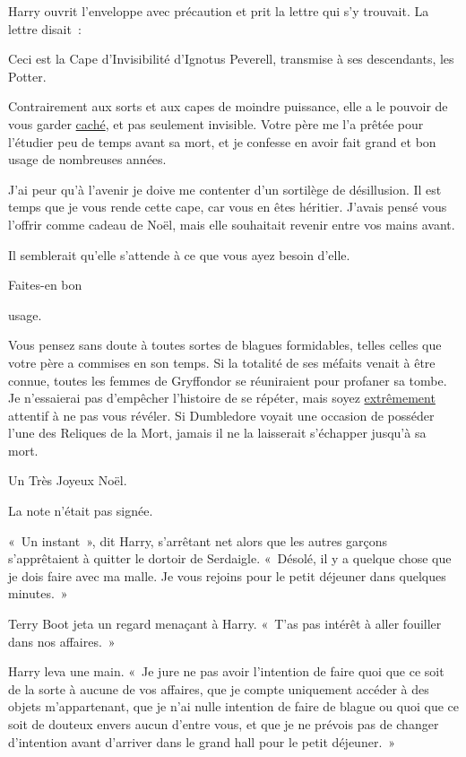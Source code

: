 Harry ouvrit l'enveloppe avec précaution et prit la lettre qui s'y trouvait.
La lettre disait~:
\begin{writtenNote}
Ceci est la Cape d'Invisibilité d'Ignotus Peverell, transmise à ses descendants, les Potter.
\strut Contrairement aux sorts et aux capes de moindre puissance, elle a le pouvoir de vous garder \underline{caché}, et pas seulement invisible.
Votre père me l'a prêtée pour l'étudier peu de temps avant sa mort, et je confesse en avoir fait grand et bon usage de nombreuses années.

J'ai peur qu'à l'avenir je doive me contenter d'un sortilège de désillusion.
Il est temps que je vous rende cette cape, car vous en êtes héritier.
J'avais pensé vous l'offrir comme cadeau de Noël, mais elle souhaitait revenir entre vos mains avant. \strut 
Il semblerait qu'elle s'attende à ce que vous ayez besoin d'elle. \strut
Faites-en bon \strut usage\vphantom{l}.

Vous pensez sans doute à toutes sortes de blagues formidables, telles celles que votre père a commises en son temps.
Si la totalité de ses méfaits venait à être connue, toutes les femmes de Gryffondor se réuniraient pour profaner sa tombe.
Je n'essaierai pas d'empêcher l'histoire de se répéter, mais soyez \underline{extrêmement} attentif à ne pas vous révéler.
Si Dumbledore voyait une occasion de posséder l'une des Reliques de la Mort, jamais il ne la laisserait s'échapper jusqu'à sa mort.

Un Très Joyeux Noël.

\end{writtenNote}

La note n'était pas signée.

\later

«~Un instant~», dit Harry, s'arrêtant net alors que les autres garçons s'apprêtaient à quitter le dortoir de Serdaigle.
«~Désolé, il y a quelque chose que je dois faire avec ma malle.
Je vous rejoins pour le petit déjeuner dans quelques minutes.~»

Terry Boot jeta un regard menaçant à Harry.
«~T'as pas intérêt à aller fouiller dans nos affaires.~»

Harry leva une main.
«~Je jure ne pas avoir l'intention de faire quoi que ce soit de la sorte à aucune de vos affaires, que je compte uniquement accéder à des objets m'appartenant, que je n'ai nulle intention de faire de blague ou quoi que ce soit de douteux envers aucun d'entre vous, et que je ne prévois pas de changer d'intention avant d'arriver dans le grand hall pour le petit déjeuner.~»

